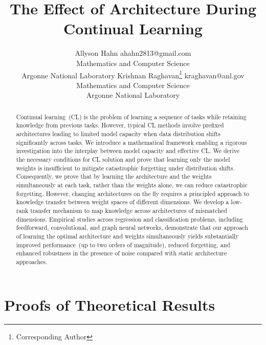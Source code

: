 \documentclass[10pt]{article} %
\title{The Effect of Architecture During Continual Learning}
\author{\name Allyson Hahn \email ahahn2813@gmail.com\\
      \addr Mathematics and Computer Science \\
      Argonne National Laboratory
      \AND
      \name Krishnan Raghavan\footnote{Corresponding Author} \email kraghavan@anl.gov \\
      \addr Mathematics and Computer Science \\
      Argonne National Laboratory }
\begin{document}
\maketitle
\begin{abstract}
Continual learning~(CL) is the problem of learning a sequence of tasks while retaining knowledge from previous tasks. However, typical CL methods involve prefixed architectures leading to limited model capacity when data distribution shifts significantly across tasks. We introduce a mathematical framework  enabling a rigorous investigation into the interplay between model capacity and effective CL. We derive the necessary conditions for CL solution and prove that learning only the model weights is insufficient to mitigate catastrophic forgetting under distribution shifts. Consequently, we prove that by learning the architecture and the weights simultaneously at each task, rather than the weights alone, we can reduce catastrophic forgetting. However, changing architectures on the fly requires a principled approach to knowledge transfer between weight spaces of different dimensions. We develop a low-rank transfer mechanism to map knowledge across architectures of mismatched dimensions. Empirical studies across regression and classification problems, including feedforward, convolutional, and graph neural networks, demonstrate that our approach of learning the optimal architecture and weights simultaneously yields substantially improved performance~(up to two orders of magnitude), reduced forgetting, and enhanced robustness in the presence of noise compared with static architecture approaches. 
\end{abstract}



\appendix
\section*{Proofs of Theoretical Results}

% 

\begin{flushright}
  \scriptsize

  \end{flushright}
\end{document}
